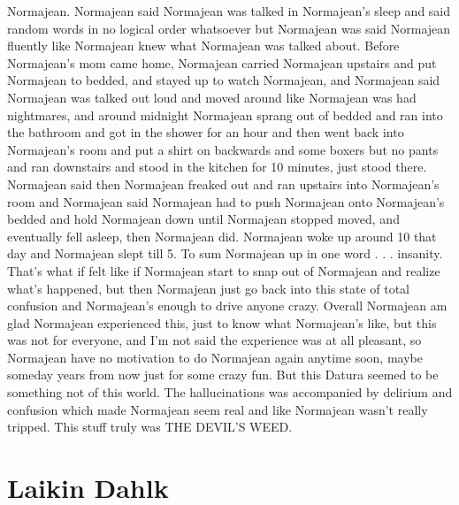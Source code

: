 \documentclass[12pt]{book}
\begin{document}
Normajean. Normajean said Normajean was talked in Normajean's sleep and said random words in no logical order whatsoever but Normajean was said Normajean fluently like Normajean knew what Normajean was talked about. Before Normajean's mom came home, Normajean carried Normajean upstairs and put Normajean to bedded, and stayed up to watch Normajean, and Normajean said Normajean was talked out loud and moved around like Normajean was had nightmares, and around midnight Normajean sprang out of bedded and ran into the bathroom and got in the shower for an hour and then went back into Normajean's room and put a shirt on backwards and some boxers but no pants and ran downstairs and stood in the kitchen for 10 minutes, just stood there. Normajean said then Normajean freaked out and ran upstairs into Normajean's room and Normajean said Normajean had to push Normajean onto Normajean's bedded and hold Normajean down until Normajean stopped moved, and eventually fell asleep, then Normajean did. Normajean woke up around 10 that day and Normajean slept till 5. To sum Normajean up in one word . . .  insanity. That's what if felt like if Normajean start to snap out of Normajean and realize what's happened, but then Normajean just go back into this state of total confusion and Normajean's enough to drive anyone crazy. Overall Normajean am glad Normajean experienced this, just to know what Normajean's like, but this was not for everyone, and I'm not said the experience was at all pleasant, so Normajean have no motivation to do Normajean again anytime soon, maybe someday years from now just for some crazy fun. But this Datura seemed to be something not of this world. The hallucinations was accompanied by delirium and confusion which made Normajean seem real and like Normajean wasn't really tripped. This stuff truly was THE DEVIL'S WEED.



\chapter{Laikin Dahlk}
\end{document}
